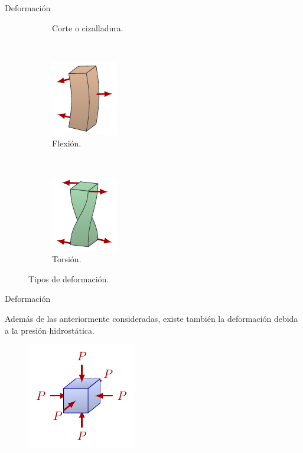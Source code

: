 \documentclass[11pt,handout,aspectratio=1610]{beamer}
\begin{document}
\begin{frame}{Deformación}
\begin{figure}
\begin{subfigure}{0.3\textwidth}
            \caption{Corte o cizalladura.}
        \end{subfigure}
        ~
        \begin{subfigure}{0.3\textwidth}
            \centering
            \includegraphics{../figs/mechanics_stress-4.pdf}
            \caption{Flexión.}
        \end{subfigure}
        ~
        \begin{subfigure}{0.3\textwidth}
            \centering
            \includegraphics{../figs/mechanics_stress-5.pdf}
            \caption{Torsión.}
        \end{subfigure}
        \caption{Tipos de deformación.}
    \end{figure}

    
\end{frame}

\begin{frame}{Deformación}

    Además de las anteriormente consideradas, existe también la deformación debida a la presión hidrostática.

    \begin{figure}
        \centering
        \includegraphics{../figs/fluid_dynamics_pressure-2.pdf}
    \end{figure}

    
\end{frame}
\end{document}
